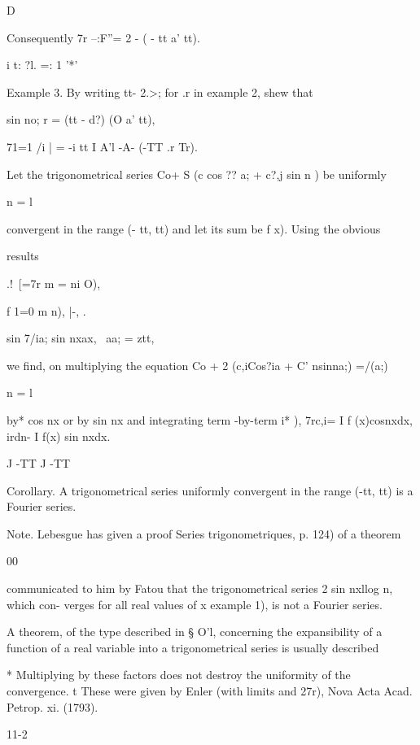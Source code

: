 D

Consequently 7r --:F''= 2 - ( - tt a' tt).

i t: ?l. =: 1 '*'

Example 3. By writing tt- 2.>; for .r in example 2, shew that

  sin no; r = (tt - d?) (O a' tt),

71=1 /i | = -i tt I A'l -A- (-TT .r Tr).


Let the trigonometrical series Co+ S (c cos ?? a; + c?,j sin n ) be
uniformly

n = l

convergent in the range (- tt, tt) and let its sum be f x). Using the
obvious

results

.!\ [=7r m = ni O),

f   1=0 m n), |-, .

sin 7/ia; sin nxax, \, aa; = ztt,

we find, on multiplying the equation Co + 2 (c,iCos?ia + C' nsinna;)
=/(a;)

n = l

by* cos nx or by sin nx and integrating term -by-term i* ),
7rc,i= I f (x)cosnxdx, irdn- I f(x) sin nxdx.

J -TT J -TT

Corollary. A trigonometrical series uniformly convergent in the range
(-tt, tt) is a Fourier series.

Note. Lebesgue has given a proof Series trigonometriques, p. 124) of a
theorem

00

communicated to him by Fatou that the trigonometrical series 2 sin
nxllog n, which con- verges for all real values of x  example
1), is not a Fourier series.


A theorem, of the type described in § O'l, concerning the
expansibility of a function of a real variable into a trigonometrical
series is usually described

* Multiplying by these factors does not destroy the uniformity of the
convergence. t These were given by Enler (with limits and 27r), Nova
Acta Acad. Petrop. xi. (1793).

11-2
%
%

